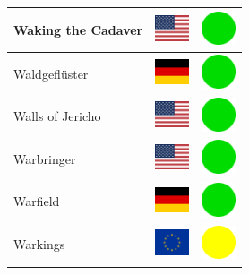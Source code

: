 \documentclass[12pt, a4paper, twoside]{report}
\begin{document}
\begin{center}
\begin{longtable}{|p{5cm}|p{2cm}|p{2cm}|}
 Waking the Cadaver                                         & \includegraphics[width=1cm]{../4x3/us} &   \includegraphics[width=1cm]{../likes/y} \\ \hline
 Waldgeflüster                                              & \includegraphics[width=1cm]{../4x3/de} &   \includegraphics[width=1cm]{../likes/y} \\ \hline
 Walls of Jericho                                           & \includegraphics[width=1cm]{../4x3/us} &   \includegraphics[width=1cm]{../likes/y} \\ \hline
 Warbringer                                                 & \includegraphics[width=1cm]{../4x3/us} &   \includegraphics[width=1cm]{../likes/y} \\ \hline
 Warfield                                                   & \includegraphics[width=1cm]{../4x3/de} &   \includegraphics[width=1cm]{../likes/y} \\ \hline
 Warkings                                                   & \includegraphics[width=1cm]{../4x3/eu} &   \includegraphics[width=1cm]{../likes/m} \\ \hline

\end{longtable}
\end{center}
\end{document}
